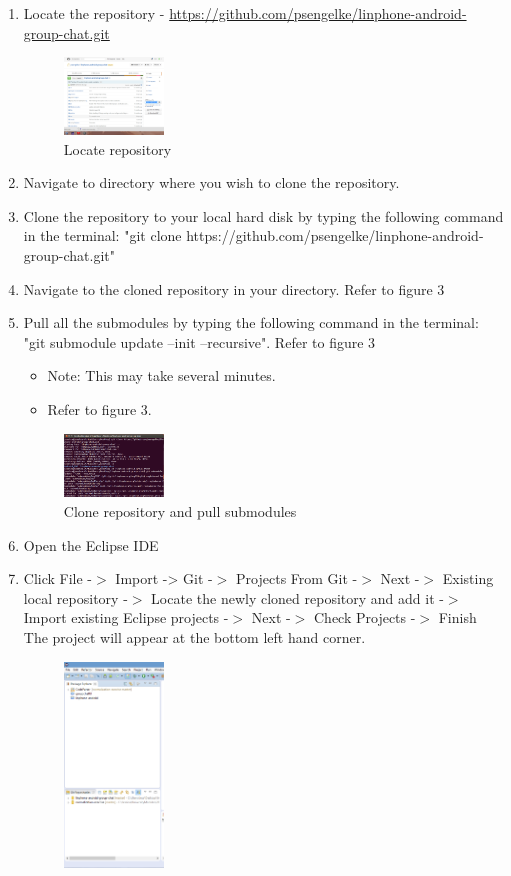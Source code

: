 \documentclass[11pt]{article}
\begin{document}
\begin{enumerate}
\item Locate the repository - \url{https://github.com/psengelke/linphone-android-group-chat.git}
\begin{figure}[H]
\includegraphics[width=100px]{./images/repoLocate.png}
\caption{Locate repository}
\label{repoLocate}
\end{figure}
\item Navigate to directory where you wish to clone the repository. 
\item Clone the repository to your local hard disk by typing the following command in the terminal: "git clone https://github.com/psengelke/linphone-android-group-chat.git" 
\item Navigate to the cloned repository in your directory. Refer to figure 3
\item Pull all the submodules by typing the following command in the terminal: "git submodule update --init --recursive". Refer to figure 3
\begin{itemize}
\item Note: This may take several minutes. 
\item Refer to figure 3.
\end{itemize}
\begin{figure}[H]
\includegraphics[width=100px]{./images/clone.png}
\caption{Clone repository and pull submodules}
\label{repoClone}
\end{figure}
\item Open the Eclipse IDE
\item Click File -$>$ Import -> Git -$>$ Projects From Git -$>$ Next -$>$ Existing local repository -$>$ Locate the newly cloned repository and add it -$>$ Import existing Eclipse projects -$>$ Next -$>$ Check Projects -$>$ Finish
\subitem The project will appear at the bottom left hand corner.
\begin{figure}[H]
\includegraphics[width=100px]{./images/git.png}

\end{figure}
\end{enumerate}
\end{document}
